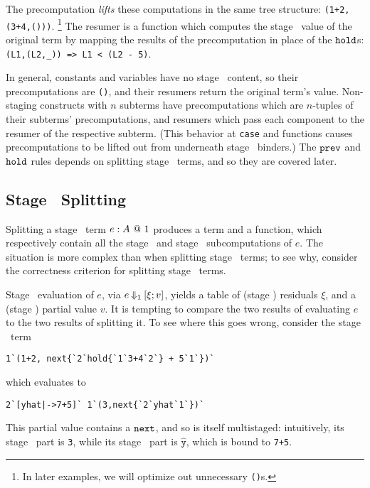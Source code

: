 
The precomputation \emph{lifts} these computations in the same tree
structure: \verb|(1+2,(3+4,()))|.%
\footnote{In later examples, we will optimize out unnecessary \texttt{()}s.}
The resumer is a function which computes the stage \bbtwo\ value of the original
term by mapping the results of the precomputation in place of the ${\tt hold}$s:
\verb|(L1,(L2,_)) => L1 < (L2 - 5)|. 


In general, constants and variables have no stage \bbone\ content, so their
precomputations are \texttt{()}, and their resumers return the original term's
value. Non-staging constructs with $n$ subterms have precomputations which are
$n$-tuples of their subterms' precomputations, and resumers which pass each
component to the resumer of the respective subterm. (This behavior at
\texttt{case} and functions causes precomputations to be lifted out from
underneath stage \bbtwo\ binders.) The ${\tt prev}$ and ${\tt hold}$ rules depends on
splitting stage \bbone\ terms, and so they are covered later.

\subsection{Stage \bbone\ Splitting}

Splitting a stage \bbone\ term ${e}:{A}~@~ 1$ produces a term and a function,
which respectively contain all the stage \bbone\ and stage \bbtwo\
subcomputations of $e$. The situation is more complex than when splitting stage
\bbtwo\ terms; to see why, consider the correctness criterion for splitting
stage \bbone\ terms.

Stage \bbone\ evaluation of $e$, via $e\mathbin{{\Downarrow_{ 1}}}[\xi;v]$,
yields a table of (stage \bbtwo) residuals $\xi$, and a (stage \bbone) partial
value $v$. It is tempting to compare the two results of evaluating $e$ to the
two results of splitting it. To see where this goes wrong, consider the stage
\bbone\ term
\begin{lstlisting}
1`(1+2, next{`2`hold{`1`3+4`2`} + 5`1`})`
\end{lstlisting}
which evaluates to
\begin{lstlisting}
2`[yhat|->7+5]` 1`(3,next{`2`yhat`1`})`
\end{lstlisting}
This partial value contains a ${\tt next}$, and so is itself multistaged:
intuitively, its stage \bbone\ part is \texttt{3}, while its stage \bbtwo\ part
is $\mathtt{\hat{y}}$, which is bound to \texttt{7+5}.

